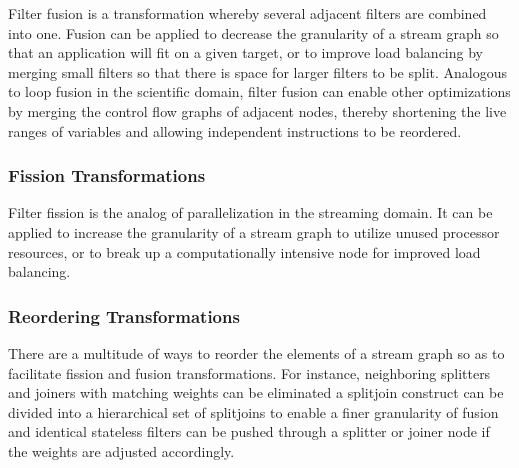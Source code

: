 Filter fusion is a transformation whereby several adjacent filters are
combined into one.  Fusion can be applied to decrease the granularity
of a stream graph so that an application will fit on a given target,
or to improve load balancing by merging small filters so that there is
space for larger filters to be split.  Analogous to loop fusion in the
scientific domain, filter fusion can enable other optimizations by
merging the control flow graphs of adjacent nodes, thereby shortening
the live ranges of variables and allowing independent instructions to
be reordered.



\subsubsection{Fission Transformations}

Filter fission is the analog of parallelization in the streaming
domain.  It can be applied to increase the granularity of a stream
graph to utilize unused processor resources, or to break up a
computationally intensive node for improved load balancing.


\subsubsection{Reordering Transformations}

There are a multitude of ways to reorder the elements of a stream
graph so as to facilitate fission and fusion transformations.  For
instance, neighboring splitters and joiners with matching weights can
be eliminated a splitjoin construct can be divided into a hierarchical
set of splitjoins to enable a finer granularity of fusion and
identical stateless filters can be pushed through a splitter or joiner
node if the weights are adjusted accordingly.

